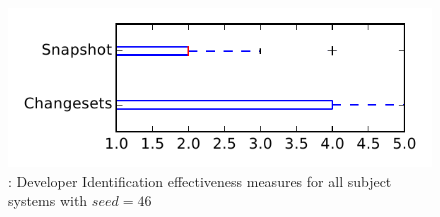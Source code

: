 
\begin{figure}
\centering
\includegraphics[height=0.4\textheight]{figures/dit_seed/rq1_tiny_46}
\caption{\rtwo: Developer Identification effectiveness measures for all subject systems with $seed=46$}
\label{fig:dit_seed:rq1:tiny}
\end{figure}
